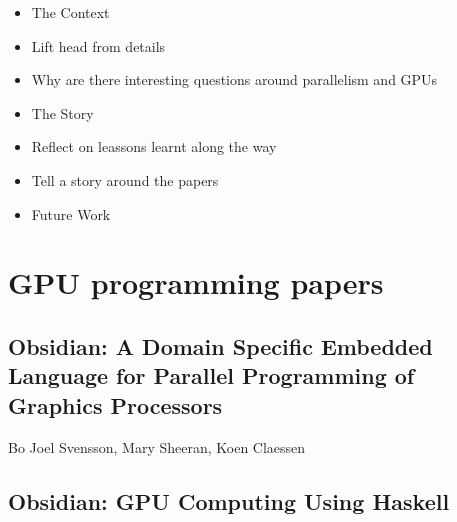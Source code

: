 \documentclass[a4paper]{book}
\begin{document}
\begin{itemize} 
  \item The Context
  \item Lift head from details 
  \item Why are there interesting questions around parallelism and GPUs
  \item The Story
  \item Reflect on leassons learnt along the way 
  \item Tell a story around the papers 
  \item Future Work
\end{itemize} 




\clearpage{}


%
%




\chapter{GPU programming papers}

% 
\cleardoublepage 

\section{Obsidian: A Domain Specific Embedded Language for Parallel Programming of Graphics Processors}
\label{sec:paper1}

\begin{center} 
Bo Joel Svensson, Mary Sheeran, Koen Claessen
\end{center}



% 
\cleardoublepage 

\section{Obsidian: GPU Computing Using Haskell}
\label{sec:paper2}
\end{document}
